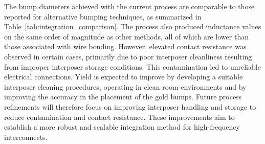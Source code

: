 \documentclass[conference]{IEEEtran}
\begin{document}
The bump diameters achieved with the current process are comparable to those reported for alternative bumping techniques, as summarized in Table~\ref{tab:integration_comparison}. The process also produced inductance values on the same order of magnitude as other methods, all of which are lower than those associated with wire bonding. However, elevated contact resistance was observed in certain cases, primarily due to poor interposer cleanliness resulting from improper interposer storage conditions. This contamination led to unreliable electrical connections. Yield is expected to improve by developing a suitable interposer cleaning procedures, operating in clean room environments and by improving the accuracy in the placement of the gold bumps. Future process refinements will therefore focus on improving interposer handling and storage to reduce contamination and contact resistance. These improvements aim to establish a more robust and scalable integration method for high-frequency interconnects.
\end{document}
